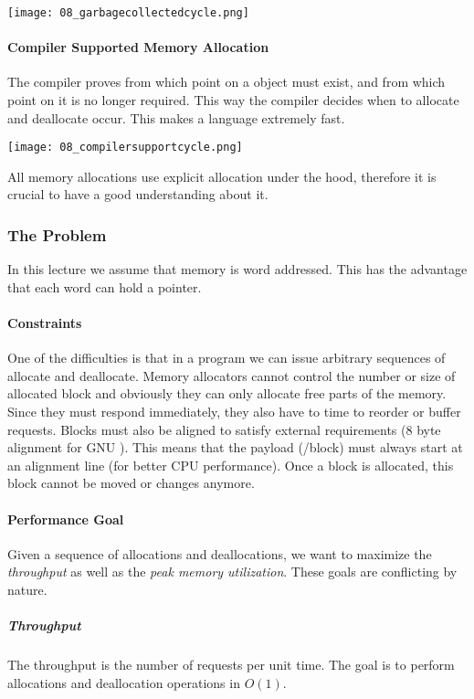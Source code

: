 \texttt{[image: 08\_garbagecollectedcycle.png]}

\paragraph{Compiler Supported Memory Allocation}
The compiler proves from which point on a object must exist, and from which point on it is no longer required. This way the compiler decides when to allocate and deallocate occur. This makes a language extremely fast.

\texttt{[image: 08\_compilersupportcycle.png]}

All memory allocations use explicit allocation under the hood, therefore it is crucial to have a good understanding about it.

\subsubsection{The Problem}
In this lecture we assume that memory is word addressed. This has the advantage that each word can hold a pointer.

\paragraph{Constraints}
One of the difficulties is that in a program we can issue arbitrary sequences of allocate and deallocate. Memory allocators cannot control the number or size of allocated block and obviously they can only allocate free parts of the memory. Since they must respond immediately, they also have to time to reorder or buffer requests. Blocks must also be aligned to satisfy external requirements (8 byte alignment for GNU ). This means that the payload (/block) must always start at an alignment line (for better CPU performance). Once a block is allocated, this block cannot be moved or changes anymore.

\paragraph{Performance Goal}
Given a sequence of allocations and deallocations, we want to maximize the \textit{throughput} as well as the \textit{peak memory utilization}. These goals are conflicting by nature.

\subparagraph{Throughput}
The throughput is the number of requests per unit time. The goal is to perform allocations and deallocation operations in $O(1)$.

